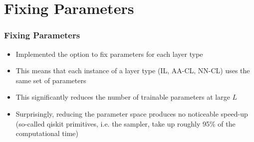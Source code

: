 \documentclass{beamer}
\begin{document}
\section{Fixing Parameters}

\begin{frame}
\frametitle{Fixing Parameters}
\begin{itemize}
\item Implemented the option to \alert{fix parameters for each layer type}
\item This means that each instance of a layer type (IL, AA-CL, NN-CL) uses the same set of parameters 
\item This significantly \alert{reduces the number of trainable parameters} at large $L$
\item Surprisingly, reducing the parameter space \alert{produces no noticeable speed-up} (so-called qiskit primitives, i.e. the sampler, take up roughly 95\% of the computational time)
\end{itemize}
\end{frame}
\end{document}
